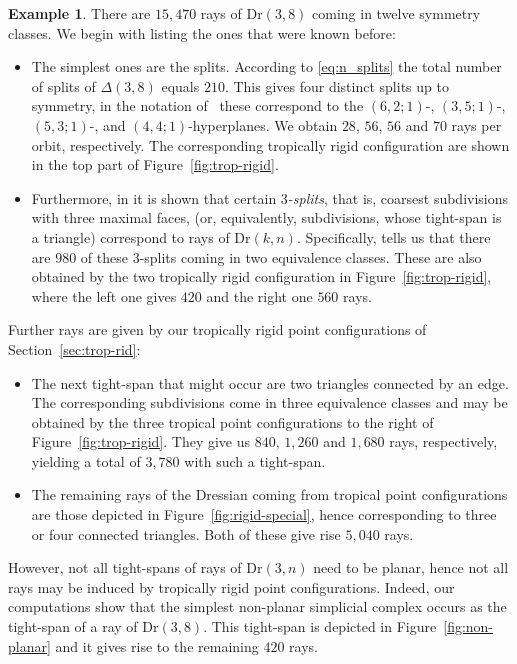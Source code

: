 \documentclass[11pt,a4paper]{amsart}
\newcommand{\Hypersimplex}[2]{{\Delta(#1,#2)}}
\newcommand{\Dr}[2]{{\mathrm{Dr}(#1,#2)}}
\theoremstyle{plain}
\theoremstyle{definition}
\newtheorem{example}[theorem]{Example}
\begin{document}
\begin{example}\label{ex:DR38-rays}
  There are $15,\!470$ rays of $\Dr 38$ coming in twelve symmetry classes. We begin with listing the
  ones that were known before:
  \begin{itemize}
  \item The simplest ones are the splits. According to \eqref{eq:n_splits} the total number of
    splits of $\Hypersimplex{3}{8}$ equals $210$. This gives four distinct splits up to symmetry, in
    the notation of~\cite{MR2502496} these correspond to the $(6,2;1)$-, $(3,5;1)$-, $(5,3;1)$-, and
    $(4,4;1)$-hyperplanes.  We obtain $28$, $56$, $56$ and $70$ rays per orbit, respectively. The
    corresponding tropically rigid configuration are shown in the top part of
    Figure~\ref{fig:trop-rigid}.
  \item Furthermore, in \cite[Sec.~6]{Herrmann09} it is shown that certain \emph{$3$-splits},
    that is, coarsest subdivisions with three maximal faces, (or, equivalently, subdivisions, whose
    tight-span is a triangle) correspond to rays of $\Dr kn$. Specifically,
    \cite[Cor.~6.4]{Herrmann09} tells us that there are $980$ of these $3$-splits coming in two
    equivalence classes. These are also obtained by the two tropically rigid configuration in
    Figure~\ref{fig:trop-rigid}, where the left one gives $420$ and the right one $560$ rays.
  \end{itemize}
  Further rays are given by our tropically rigid point configurations of Section~\ref{sec:trop-rid}:
  \begin{itemize}
  \item The next tight-span that might occur are two triangles connected by an edge. The
    corresponding subdivisions come in three equivalence classes and may be obtained by the three
    tropical point configurations to the right of Figure~\ref{fig:trop-rigid}. They give us $840$,
    $1,\!260$ and $1,\!680$ rays, respectively, yielding a total of $3,\!780$ with such a
    tight-span.
  \item The remaining rays of the Dressian coming from tropical point configurations are those
    depicted in Figure~\ref{fig:rigid-special}, hence corresponding to three or four connected
    triangles. Both of these give rise $5,\!040$ rays.
  \end{itemize}

  However, not all tight-spans of rays of $\Dr 3n$ need to be planar, hence not all rays may be
  induced by tropically rigid point configurations. Indeed, our computations show that the simplest
  non-planar simplicial complex occurs as the tight-span of a ray of $\Dr 38$. This tight-span is
  depicted in Figure~\ref{fig:non-planar} and it gives rise to the remaining $420$ rays.


\end{example}
\end{document}
